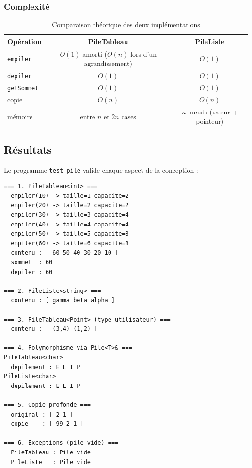 \documentclass[11pt,a4paper]{article}
\newcommand{\code}[1]{\texttt{#1}}
\begin{document}
\subsubsection{Complexité}

\begin{table}[H]
\centering
\begin{tabular}{lcc}
  \toprule
  \textbf{Opération} & \textbf{PileTableau} & \textbf{PileListe} \\
  \midrule
  \code{empiler}    & $O(1)$ amorti ($O(n)$ lors d'un agrandissement) & $O(1)$ \\
  \code{depiler}    & $O(1)$ & $O(1)$ \\
  \code{getSommet}  & $O(1)$ & $O(1)$ \\
  copie             & $O(n)$ & $O(n)$ \\
  mémoire           & entre $n$ et $2n$ cases & $n$ nœuds (valeur + pointeur) \\
  \bottomrule
\end{tabular}
\caption{Comparaison théorique des deux implémentations}
\end{table}

\subsection{Résultats}

Le programme \code{test\_pile} valide chaque aspect de la conception :

\begin{lstlisting}[style=sortie, caption={Extrait de la sortie de \code{test\_pile}}]
=== 1. PileTableau<int> ===
  empiler(10) -> taille=1 capacite=2
  empiler(20) -> taille=2 capacite=2
  empiler(30) -> taille=3 capacite=4
  empiler(40) -> taille=4 capacite=4
  empiler(50) -> taille=5 capacite=8
  empiler(60) -> taille=6 capacite=8
  contenu : [ 60 50 40 30 20 10 ]
  sommet  : 60
  depiler : 60

=== 2. PileListe<string> ===
  contenu : [ gamma beta alpha ]

=== 3. PileTableau<Point> (type utilisateur) ===
  contenu : [ (3,4) (1,2) ]

=== 4. Polymorphisme via Pile<T>& ===
PileTableau<char>
  depilement : E L I P
PileListe<char>
  depilement : E L I P

=== 5. Copie profonde ===
  original : [ 2 1 ]
  copie    : [ 99 2 1 ]

=== 6. Exceptions (pile vide) ===
  PileTableau : Pile vide
  PileListe   : Pile vide
\end{lstlisting}
\end{document}
